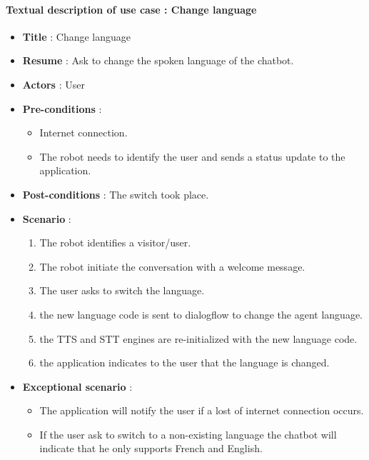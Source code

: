 \paragraph{Textual description of use case : Change language}
\begin{itemize}
    \item \textbf{Title} : Change language
    \item \textbf{Resume} : Ask to change the spoken language of the chatbot.
    \item \textbf{Actors} : User
    \item \textbf{Pre-conditions} : \begin{itemize}
        \item Internet connection.
        \item The robot needs to identify the user and sends a status update to the application. 
    \end{itemize}    
    \item \textbf{Post-conditions} : The switch took place.
    \item \textbf{Scenario} : \begin{enumerate}
        \item The robot identifies a visitor/user.
        \item The robot initiate the conversation with a welcome message.
        \item The user asks to switch the language.
        \item the new language code is sent to dialogflow to change the agent language. 
        \item the TTS and STT engines are re-initialized with the new language code.
        \item the application indicates to the user that the language is changed.
    \end{enumerate}
    \item \textbf{Exceptional scenario} : \begin{itemize}
        \item The application will notify the user if a lost of internet connection occurs.
        \item If the user ask to switch to a non-existing language the chatbot will indicate that he only supports French and English.  
    \end{itemize}
\end{itemize}

